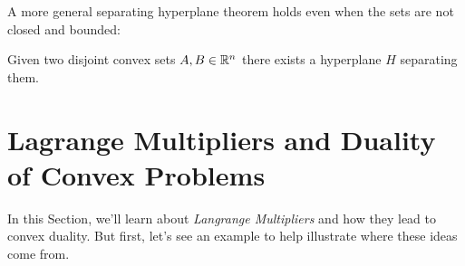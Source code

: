 A more general separating hyperplane theorem holds even when the sets
are not closed and bounded:

\begin{theorem} \label{th:sht}
Given two disjoint convex sets $A, B \in \mathbb{R}^n$ there exists a hyperplane $H$
separating them.
\end{theorem}


\section{Lagrange Multipliers and Duality of Convex Problems}

In this Section, we'll learn about \emph{Langrange Multipliers} and
how they lead to convex duality.
But first, let's see an example to help illustrate where these ideas
come from.

